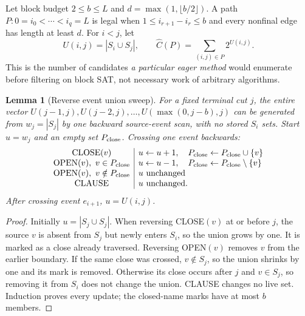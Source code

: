 \documentclass[11pt]{article}
\newtheorem{lemma}[theorem]{Lemma}
\begin{document}
Let block budget $2\le b\le L$ and $d=\max(1,\lfloor b/2\rfloor)$. A path $P:0=i_0<\cdots<i_q=L$ is legal when $1\le i_{r+1}-i_r\le b$ and every nonfinal edge has length at least $d$. For $i<j$, let
\[
U(i,j)=|S_i\cup S_j|,\qquad
\widehat C(P)=\sum_{(i,j)\in P}2^{U(i,j)}.
\]
This is the number of candidates \emph{a particular eager method} would enumerate before filtering on block SAT, not necessary work of arbitrary algorithms.

\begin{lemma}[Reverse event union sweep]
For a fixed terminal cut $j$, the entire vector
$U(j-1,j),U(j-2,j),\dots,U(\max(0,j-b),j)$
can be generated from $w_j=|S_j|$ by one backward source-event scan, with no stored $S_i$ sets. Start $u=w_j$ and an empty set $P_{\rm close}$. Crossing one event backwards:
\[
\begin{array}{c|l}
{\rm CLOSE}(v)&u\leftarrow u+1,\quad P_{\rm close}\leftarrow P_{\rm close}\cup\{v\}\\
{\rm OPEN}(v),\ v\in P_{\rm close}
&u\leftarrow u-1,\quad P_{\rm close}\leftarrow P_{\rm close}\setminus\{v\}\\
{\rm OPEN}(v),\ v\notin P_{\rm close}&u\text{ unchanged}\\
{\rm CLAUSE}&u\text{ unchanged}.
\end{array}
\]
After crossing event $e_{i+1}$, $u=U(i,j)$.
\end{lemma}
\begin{proof}
Initially $u=|S_j\cup S_j|$. When reversing CLOSE$(v)$ at or before $j$, the source $v$ is absent from $S_j$ but newly enters $S_i$, so the union grows by one. It is marked as a close already traversed. Reversing OPEN$(v)$ removes $v$ from the earlier boundary. If the same close was crossed, $v\notin S_j$, so the union shrinks by one and its mark is removed. Otherwise its close occurs after $j$ and $v\in S_j$, so removing it from $S_i$ does not change the union. CLAUSE changes no live set. Induction proves every update; the closed-name marks have at most $b$ members.
\end{proof}
\end{document}
